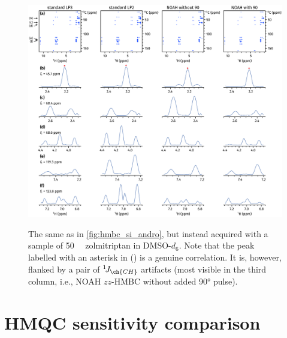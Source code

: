 \documentclass[a4paper,11pt]{article}
\newcommand{\onejch}{{}^1\!J_{\ch{CH}}}
\begin{document}
\begin{refsection}
\begin{figure}[H]
    \centering
    \includegraphics[width=\textwidth]{hmbc_si_zolmi.png}
    {\label{fig:hmbc_si_zolmi_overall}}
    {\label{fig:hmbc_si_zolmi_trace1}}
    {\label{fig:hmbc_si_zolmi_trace2}}
    {\label{fig:hmbc_si_zolmi_trace3}}
    {\label{fig:hmbc_si_zolmi_trace4}}
    {\label{fig:hmbc_si_zolmi_trace5}}
    \caption{
        The same as in \cref{fig:hmbc_si_andro}, but instead acquired with a sample of \SI{50}{\milli\molar} zolmitriptan in DMSO-\(d_6\).
        Note that the peak labelled with an asterisk in () is a genuine correlation.
        It is, however, flanked by a pair of \(\onejch{}\) artifacts (most visible in the third column, i.e., NOAH \(zz\)-HMBC without added \ang{90} pulse).
    }
    \label{fig:hmbc_si_zolmi}
\end{figure}

\section{HMQC sensitivity comparison}
\label{sec:si_hmqc_comp_snr}


\end{refsection}
\end{document}
